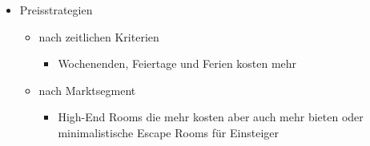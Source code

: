 \documentclass{article}
\begin{document}
\begin{itemize}
\begin{itemize}
\begin{itemize}
				\item{nach Nachfrage}
				\begin{itemize}
					\item{, bei sehr hoher Nachfrage erhöht sich der Preis. Last-Minute Buchungen sind billiger um eventuelle Leerzeiten noch zu füllen}
				\end{itemize}
			\end{itemize}
			\item{Preisstrategien}
			\begin{itemize}
				\item{nach zeitlichen Kriterien}
				\begin{itemize}
					\item{Wochenenden, Feiertage und Ferien kosten mehr}
				\end{itemize}
				\item{nach Marktsegment}
				\begin{itemize}
					\item{High-End Rooms die mehr kosten aber auch mehr bieten oder minimalistische Escape Rooms für Einsteiger}
				\end{itemize}
			\end{itemize}
		\end{itemize}
	\end{itemize}
	























  
\end{document}
